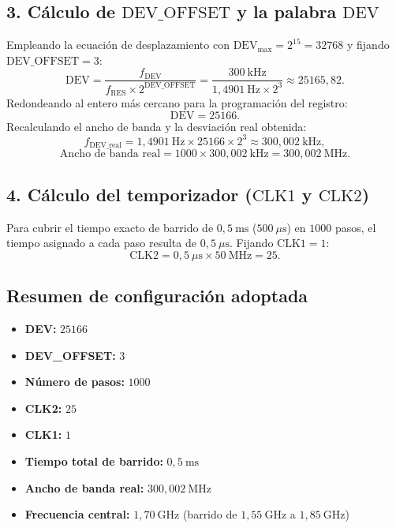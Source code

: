 \subsection*{3. Cálculo de $\mathrm{DEV\_OFFSET}$ y la palabra $\mathrm{DEV}$}
Empleando la ecuación de desplazamiento con $\mathrm{DEV}_{\max} = 2^{15} = 32768$ y fijando $\mathrm{DEV\_OFFSET} = 3$:
\begin{equation}
\mathrm{DEV} = \frac{f_{\mathrm{DEV}}}{f_{\mathrm{RES}} \times 2^{\mathrm{DEV\_OFFSET}}} = \frac{300~\mathrm{kHz}}{1{,}4901~\mathrm{Hz} \times 2^3} \approx 25165{,}82.
\end{equation}
Redondeando al entero más cercano para la programación del registro:
\begin{equation}
\mathrm{DEV} = 25166.
\end{equation}
Recalculando el ancho de banda y la desviación real obtenida:
\begin{equation}
f_{\mathrm{DEV\_real}} = 1{,}4901~\mathrm{Hz} \times 25166 \times 2^3 \approx 300{,}002~\mathrm{kHz},
\end{equation}
\begin{equation}
\text{Ancho de banda real} = 1000 \times 300{,}002~\mathrm{kHz} = 300{,}002~\mathrm{MHz}.
\end{equation}

\subsection*{4. Cálculo del temporizador ($\mathrm{CLK1}$ y $\mathrm{CLK2}$)}
Para cubrir el tiempo exacto de barrido de $0{,}5~\mathrm{ms}$ ($500~\mu\mathrm{s}$) en $1000$ pasos, el tiempo asignado a cada paso resulta de $0{,}5~\mu\mathrm{s}$. Fijando $\mathrm{CLK1} = 1$:
\begin{equation}
\mathrm{CLK2} = 0{,}5~\mu\mathrm{s} \times 50~\mathrm{MHz} = 25.
\end{equation}

\subsection*{Resumen de configuración adoptada}
\begin{itemize}
    \item \textbf{DEV:} $25166$
    \item \textbf{DEV\_OFFSET:} $3$
    \item \textbf{Número de pasos:} $1000$
    \item \textbf{CLK2:} $25$
    \item \textbf{CLK1:} $1$
    \item \textbf{Tiempo total de barrido:} $0{,}5~\mathrm{ms}$
    \item \textbf{Ancho de banda real:} $300{,}002~\mathrm{MHz}$ 
    \item \textbf{Frecuencia central:} $1{,}70~\mathrm{GHz}$ (barrido de $1{,}55~\mathrm{GHz}$ a $1{,}85~\mathrm{GHz}$)
\end{itemize}

